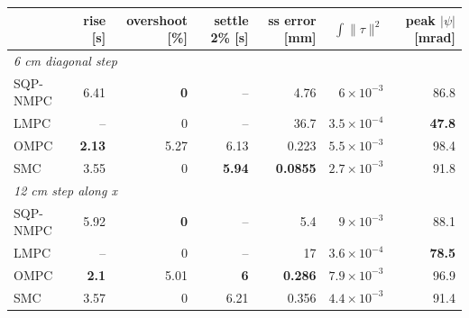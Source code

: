 \begin{tabular}{lrrrrrr}
\toprule
 & rise [s] & overshoot [\%] & settle 2\% [s] & ss error [mm] & $\int\|\tau\|^2$ & peak $|\psi|$ [mrad] \\
\midrule
\multicolumn{7}{l}{\emph{6 cm diagonal step}} \\
SQP-NMPC & 6.41 & \textbf{0} & -- & 4.76 & $6\times10^{-3}$ & 86.8 \\
LMPC & -- & 0 & -- & 36.7 & \textbf{$3.5\times10^{-4}$} & \textbf{47.8} \\
OMPC & \textbf{2.13} & 5.27 & 6.13 & 0.223 & $5.5\times10^{-3}$ & 98.4 \\
SMC & 3.55 & 0 & \textbf{5.94} & \textbf{0.0855} & $2.7\times10^{-3}$ & 91.8 \\
\midrule
\multicolumn{7}{l}{\emph{12 cm step along x}} \\
SQP-NMPC & 5.92 & \textbf{0} & -- & 5.4 & $9\times10^{-3}$ & 88.1 \\
LMPC & -- & 0 & -- & 17 & \textbf{$3.6\times10^{-4}$} & \textbf{78.5} \\
OMPC & \textbf{2.1} & 5.01 & \textbf{6} & \textbf{0.286} & $7.9\times10^{-3}$ & 96.9 \\
SMC & 3.57 & 0 & 6.21 & 0.356 & $4.4\times10^{-3}$ & 91.4 \\
\bottomrule
\end{tabular}
